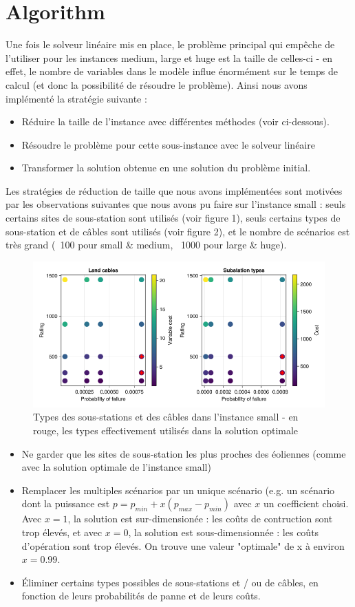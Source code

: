 \documentclass[a4paper,12pt]{article}
\begin{document}
\section {Algorithm}
Une fois le solveur linéaire mis en place, le problème principal qui empêche de l'utiliser pour les instances medium, large et huge est la taille de celles-ci - en effet, le nombre de variables dans le modèle influe énormément sur le temps de calcul (et donc la possibilité de résoudre le problème). 
Ainsi nous avons implémenté la stratégie suivante :
\begin{itemize}
    \item Réduire la taille de l'instance avec différentes méthodes (voir ci-dessous).
    \item Résoudre le problème pour cette sous-instance avec le solveur linéaire
    \item Transformer la solution obtenue en une solution du problème initial. 
\end{itemize}
Les stratégies de réduction de taille que nous avons implémentées sont motivées par les observations suivantes que nous avons pu faire sur l'instance small :
seuls certains sites de sous-station sont utilisés (voir figure 1), seuls certains types de sous-station et de câbles sont utilisés (voir figure 2), et le nombre de scénarios est très grand (~100 pour small \& medium, ~1000 pour large \& huge).
\begin{figure}[h]
    \centering
    \includegraphics[scale=0.3]{small-types.png}
    \caption{Types des sous-stations et des câbles dans l'instance small - en rouge, les types effectivement utilisés dans la solution optimale}
\end{figure}
\begin{itemize}
    \item Ne garder que les sites de sous-station les plus proches des éoliennes (comme avec la solution optimale de l'instance small)
    \item Remplacer les multiples scénarios par un unique scénario (e.g. un scénario dont la puissance est $p = p_{min} + x(p_{max} - p_{min})$ avec $x$ un coefficient choisi. Avec $x = 1$, la solution est sur-dimensionée : les coûts de contruction sont trop élevés, et avec $x = 0$, la solution est sous-dimensionnée : les coûts d'opération sont trop élevés. On trouve une valeur "optimale" de x à environ $ x = 0.99$.
    \item Éliminer certains types possibles de sous-stations et / ou de câbles, en fonction de leurs probabilités de panne et de leurs coûts.
\end{itemize}
\end{document}
